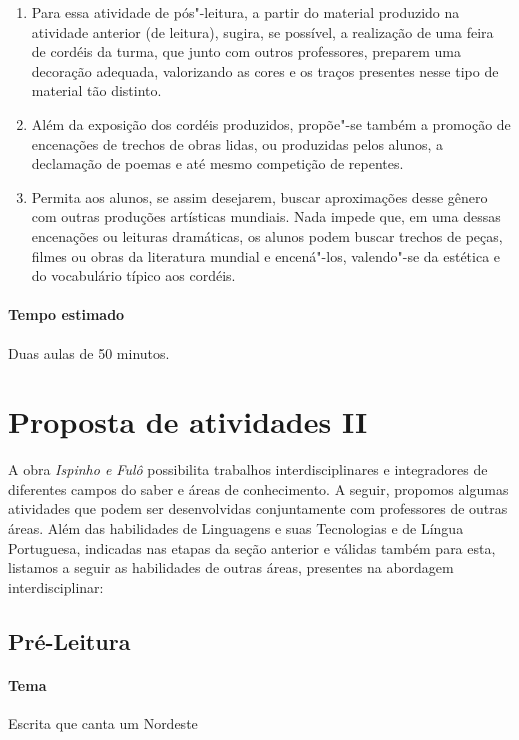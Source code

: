 \documentclass[12pt]{extarticle}
\begin{document}
\begin{enumerate}
\item
Para essa atividade de pós"-leitura, a partir do material produzido na atividade anterior (de leitura), 
sugira, se possível, a realização de uma feira de cordéis da turma, que junto com outros professores, 
preparem uma decoração adequada, valorizando as cores e os traços presentes nesse tipo de material tão
distinto. 

\item
Além da exposição dos cordéis produzidos, propõe"-se também a
promoção de encenações de trechos de obras lidas, ou produzidas pelos
alunos, a declamação de poemas e até mesmo competição de repentes. 

\item
Permita aos alunos, se assim desejarem, buscar aproximações desse gênero 
com outras produções artísticas mundiais. Nada impede que, em uma dessas encenações 
ou leituras dramáticas, os alunos podem buscar trechos de peças, filmes ou obras da
literatura mundial e encená"-los, valendo"-se da estética e do vocabulário
típico aos cordéis.

\end{enumerate}

\paragraph{Tempo estimado} Duas aulas de 50 minutos. 

\section{Proposta de atividades II}
A obra \emph{Ispinho e Fulô} possibilita trabalhos interdisciplinares e
integradores de diferentes campos do saber e áreas de conhecimento. A
seguir, propomos algumas atividades que podem ser desenvolvidas
conjuntamente com professores de outras áreas. Além das habilidades de
Linguagens e suas Tecnologias e de Língua Portuguesa, indicadas nas
etapas da seção anterior e válidas também para esta, listamos a seguir
as habilidades de outras áreas, presentes na abordagem interdisciplinar:


\subsection{Pré-Leitura}

\paragraph{Tema} Escrita que canta um Nordeste 
\end{document}
